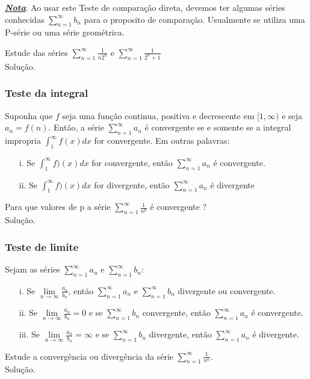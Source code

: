 \textbf{\textit{\underline{Nota}}}: Ao usar este Teste de comparação direta, devemos  ter algumas séries conhecidas $\sum_{n=1}^{\infty}b_{n}$ para o proposito de comparação. Usualmente se utiliza uma P-série ou uma série geométrica.

\begin{ex}
	Estude das séries $\sum_{n=1}^{\infty}\frac{1}{n2^{n}}$ e  $\sum_{n=1}^{\infty}\frac{1}{2^{n}+1}$\\
	Solução.
\end{ex}
\vspace*{5cm}
\subsubsection{Teste da integral}
Suponha que $f$ seja uma função continua, positiva e decrescente em $[1,\infty)$ e seja $a_{n}=f(n)$. Então, a série $\sum_{n=1}^{\infty}a_{n}$ é convergente se e somente se a integral impropria $\int_{1}^{\infty}f(x)dx$ for convergente. Em outras palavras:\\

\begin{itemize}
	\item[i.] Se $\int_{1}^{\infty}f)(x)dx$ for convergente, então $\sum_{n=1}^{\infty}a_{n}$ é convergente.
	\item[ii.] Se $\int_{1}^{\infty}f)(x)dx$ for divergente, então $\sum_{n=1}^{\infty}a_{n}$ é divergente
\end{itemize}
\begin{ex}
	Para que valores de p a série $\sum_{n=1}^{\infty}\frac{1}{n^{p}}$ é convergente ?\\
	Solução.
\end{ex}
\vspace*{8cm}
\subsubsection{Teste de limite}
Sejam as séries $\sum_{n=1}^{\infty}a_{n}$ e $\sum_{n=1}^{\infty}b_{n}$: \\
\begin{itemize}
	\item[i.] Se $\lim\limits_{n\rightarrow \infty}\frac{a_{n}}{b_{n}}$, então $\sum_{n=1}^{\infty}a_{n}$ e $\sum_{n=1}^{\infty}b_{n}$ divergente ou convergente.
	\item[ii.] Se $\lim\limits_{n\rightarrow \infty}\frac{a_{n}}{b_{n}}=0$ e se $\sum_{n=1}^{\infty}b_{n}$ convergente, então $\sum_{n=1}^{\infty}a_{n}$ é convergente.
	\item[iii.] Se $\lim\limits_{n\rightarrow \infty}\frac{a_{n}}{b_{n}}=\infty$ e se $\sum_{n=1}^{\infty}b_{n}$ divergente, então $\sum_{n=1}^{\infty}a_{n}$ é divergente.
\end{itemize} 
\begin{ex}
	Estude a convergência ou divergência da série $\sum_{n=1}^{\infty}\frac{1}{n^{n}}$.\\
	Solução.
\end{ex}
\vspace*{7cm}
